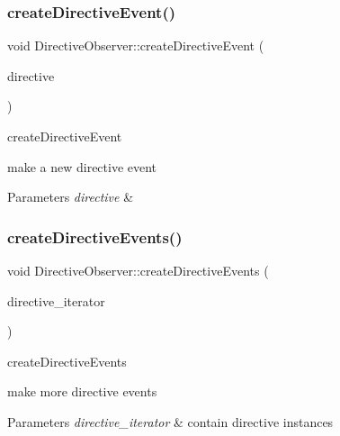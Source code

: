 \subsubsection{\texorpdfstring{create\+Directive\+Event()}{createDirectiveEvent()}}
{\footnotesize\ttfamily void Directive\+Observer\+::create\+Directive\+Event (\begin{DoxyParamCaption}\item[{\hyperlink{classdirective_1_1Directive}{Directive} $\ast$}]{directive }\end{DoxyParamCaption})}



create\+Directive\+Event 

make a new directive event 
\begin{DoxyParams}{Parameters}
{\em directive} & \\
\hline
\end{DoxyParams}
\mbox{\label{classdirective_1_1DirectiveObserver_a34c786a495ed077234647755e12f501a}} 
\subsubsection{\texorpdfstring{create\+Directive\+Events()}{createDirectiveEvents()}}
{\footnotesize\ttfamily void Directive\+Observer\+::create\+Directive\+Events (\begin{DoxyParamCaption}\item[{Directive\+Iterator $\ast$}]{directive\+\_\+iterator }\end{DoxyParamCaption})}



create\+Directive\+Events 

make more directive events 
\begin{DoxyParams}{Parameters}
{\em directive\+\_\+iterator} & contain directive instances \\
\hline
\end{DoxyParams}
\mbox{\label{classdirective_1_1DirectiveObserver_a129f3bf261411418d51a47e54ee6af59}} 
